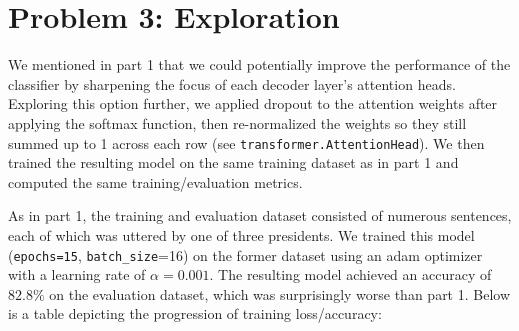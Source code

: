 \documentclass[10pt]{article}
\newcommand{\code}[1]{\texttt{#1}}
\theoremstyle{definition}
\begin{document}
\section{Problem 3: Exploration}

\noindent We mentioned in part 1 that we could potentially improve the performance of the classifier by sharpening the focus of each decoder layer's attention heads. Exploring this option further, we applied dropout to the attention weights after applying the softmax function, then re-normalized the weights so they still summed up to 1 across each row (see \code{transformer.AttentionHead}). We then trained the resulting model on the same training dataset as in part 1 and computed the same training/evaluation metrics.

\noindent As in part 1, the training and evaluation dataset consisted of numerous sentences, each of which was uttered by one of three presidents. We trained this model (\code{epochs=15}, \code{batch\_size}=16) on the former dataset using an adam optimizer with a learning rate of $\alpha = 0.001$. The resulting model achieved an accuracy of $82.8\%$ on the evaluation dataset, which was surprisingly worse than part 1. Below is a table depicting the progression of training loss/accuracy:\\
\begin{center}
\end{center}
\end{document}
